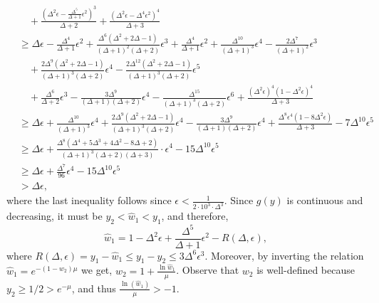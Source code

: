 \documentclass[11pt]{article}
\begin{document}
\begin{appendixproof}
\begin{align*}
&\quad + \frac{\left(\Delta^2\epsilon - \frac{\Delta^5}{\Delta+1}\epsilon^2 \right)^3}{\Delta+2} + \frac{\left(\Delta^2\epsilon - \Delta^4\epsilon^2 \right)^4}{\Delta+3}\\
& \geq \Delta\epsilon - \frac{\Delta^4}{\Delta+1}\epsilon^2 + \frac{\Delta^6(\Delta^2+2\Delta-1)}{(\Delta+1)^2(\Delta+2)}\epsilon^3 +\frac{\Delta^4}{\Delta+1}\epsilon^2 + \frac{\Delta^{10}}{(\Delta+1)^3}\epsilon^4 - \frac{2\Delta^7}{(\Delta+1)^2}\epsilon^3 \\
& \quad + \frac{2\Delta^9(\Delta^2+2\Delta-1)}{(\Delta+1)^3(\Delta+2)}\epsilon^4 - \frac{2\Delta^{12}(\Delta^2+2\Delta-1)}{(\Delta+1)^3(\Delta+2)} \epsilon^5 \\
& \quad + \frac{\Delta^6}{\Delta+2}\epsilon^3 -\frac{3\Delta^9}{(\Delta+1)(\Delta+2)}\epsilon^4 - \frac{\Delta^{15}}{(\Delta+1)^3(\Delta+2)} \epsilon^6 + \frac{(\Delta^2\epsilon)^4 (1-\Delta^2\epsilon)^4}{\Delta+3} \\
& \geq \Delta\epsilon + \frac{\Delta^{10}}{(\Delta+1)^3}\epsilon^4 + \frac{2\Delta^9(\Delta^2+2\Delta-1)}{(\Delta+1)^3(\Delta+2)}\epsilon^4 -\frac{3\Delta^9}{(\Delta+1)(\Delta+2)}\epsilon^4 + \frac{\Delta^8\epsilon^4(1-8\Delta^2\epsilon)}{\Delta+3} - 7\Delta^{10}\epsilon^5\\
& \geq \Delta\epsilon + \frac{\Delta^8\left( \Delta^4 + 5\Delta^3 + 4\Delta^2-8\Delta+2\right)}{(\Delta+1)^3(\Delta+2)(\Delta+3)} \cdot \epsilon^4 - 15\Delta^{10}\epsilon^5 \\
& \geq \Delta\epsilon +\frac{\Delta^7}{96} \epsilon^4 - 15\Delta^{10}\epsilon^5\\
&> \Delta\epsilon,
\end{align*}
where the last inequality follows since $\epsilon< \frac{1}{2\cdot 10^3 \cdot \Delta^3}$. Since $g(y)$ is continuous and decreasing, it must be $y_2 < \hat{w}_1 < y_1$, and therefore, \[
\hat{w}_1 = 1 - \Delta^2\epsilon + \frac{\Delta^5}{\Delta+1}\epsilon^2 - R(\Delta, \epsilon),
\]
where $R(\Delta,\epsilon)=y_1 - \hat{w}_1 \leq y_1 - y_2 \leq 3\Delta^6 \epsilon^3$. Moreover, by inverting the relation $\hat{w}_1=e^{-(1-w_2)\mu}$ we get, $w_2=1+\frac{\ln\hat{w}_1}{\mu}$. Observe that $w_2$ is well-defined because $y_2 \geq 1/2 > e^{-\mu}$, and thus $\frac{\ln(\hat{w}_1)}{\mu}>-1$.


\end{appendixproof}
\end{document}
